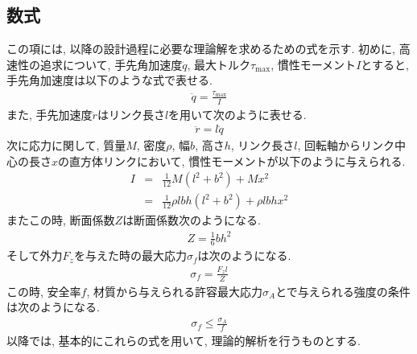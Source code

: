 \documentclass[10pt,b5paper,papersize,dvipdfmx]{jsbook}
\begin{document}
\subsection{数式}\label{数式}
この項には, 以降の設計過程に必要な理論解を求めるための式を示す. 初めに, 高速性の追求について, 手先角加速度$\ddot{q}$, 最大トルク$\tau_{\mathrm{max}}$, 慣性モーメント$I$とすると, 手先角加速度は以下のような式で表せる.
\begin{align}
\ddot{q}=\frac{\tau_{\mathrm{max}}}{I}
\end{align}
また, 手先加速度$\ddot{r}$はリンク長さ$l$を用いて次のように表せる.
\begin{align}
\ddot{r}=l\ddot{q}
\end{align}
次に応力に関して, 質量$M$, 密度$\rho$, 幅$b$, 高さ$h$, リンク長さ$l$, 回転軸からリンク中心の長さ$x$の直方体リンクにおいて, 慣性モーメントが以下のように与えられる.
\begin{eqnarray}
  I&=&\frac{1}{12}M(l^2+b^2)+Mx^2\\
  &=&\frac{1}{12} \rho lbh(l^2+b^2 )+\rho lbhx^2
\end{eqnarray}
またこの時, 断面係数$Z$は断面係数次のようになる.
\begin{align}
  Z=\frac{1}{6}bh^2
\end{align}
そして外力$F_z$を与えた時の最大応力$\sigma_f$は次のようになる.
\begin{align}
  \sigma_f=\frac{F_zl}{Z}
\end{align}
この時, 安全率$f$, 材質から与えられる許容最大応力$\sigma_A$とで与えられる強度の条件は次のようになる.
\begin{align}
  \sigma_f\leq\frac{\sigma_A}{f}
\end{align}
以降では, 基本的にこれらの式を用いて, 理論的解析を行うものとする.
\end{document}
